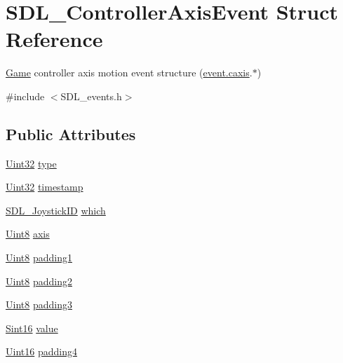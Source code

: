 \hypertarget{struct_s_d_l___controller_axis_event}{\section{S\-D\-L\-\_\-\-Controller\-Axis\-Event Struct Reference}
\label{struct_s_d_l___controller_axis_event}
}


\hyperlink{class_game}{Game} controller axis motion event structure (\hyperlink{union_s_d_l___event_aa8f6df0f2716fae56204b12ab4a4c289}{event.\-caxis}.$\ast$)  




{\ttfamily \#include $<$S\-D\-L\-\_\-events.\-h$>$}

\subsection*{Public Attributes}
\begin{DoxyCompactItemize}
\item 
\hyperlink{_s_d_l__stdinc_8h_add440eff171ea5f55cb00c4a9ab8672d}{Uint32} \hyperlink{struct_s_d_l___controller_axis_event_aa904b61e4763d28d887cf8afcc3cbb7c}{type}
\item 
\hyperlink{_s_d_l__stdinc_8h_add440eff171ea5f55cb00c4a9ab8672d}{Uint32} \hyperlink{struct_s_d_l___controller_axis_event_afc92dba0b4d1652a1ecf9e85606d1f14}{timestamp}
\item 
\hyperlink{_s_d_l__joystick_8h_a3c3d32500cb08f76ee8077983912c0bd}{S\-D\-L\-\_\-\-Joystick\-I\-D} \hyperlink{struct_s_d_l___controller_axis_event_a07087f68ea9d64b50047d65312ee7b94}{which}
\item 
\hyperlink{_s_d_l__stdinc_8h_a2944638813a090aa23e62f4da842c3e2}{Uint8} \hyperlink{struct_s_d_l___controller_axis_event_aba6543c143521aebce06a41a8cf79db0}{axis}
\item 
\hyperlink{_s_d_l__stdinc_8h_a2944638813a090aa23e62f4da842c3e2}{Uint8} \hyperlink{struct_s_d_l___controller_axis_event_af980495b1e24f9a868f2ccb25ce9629b}{padding1}
\item 
\hyperlink{_s_d_l__stdinc_8h_a2944638813a090aa23e62f4da842c3e2}{Uint8} \hyperlink{struct_s_d_l___controller_axis_event_a4a04fcd20a54db21c5258ab0e40c6ab5}{padding2}
\item 
\hyperlink{_s_d_l__stdinc_8h_a2944638813a090aa23e62f4da842c3e2}{Uint8} \hyperlink{struct_s_d_l___controller_axis_event_ab82598fe5621dca9b1a41f7b2ca1e9a0}{padding3}
\item 
\hyperlink{_s_d_l__stdinc_8h_a9d0257032c0e146ab6121bf0122712f5}{Sint16} \hyperlink{struct_s_d_l___controller_axis_event_a1ed7f14255ed01b982d40a38791d475a}{value}
\item 
\hyperlink{_s_d_l__stdinc_8h_a31fcc0a076c9068668173ee26d33e42b}{Uint16} \hyperlink{struct_s_d_l___controller_axis_event_ae0ad0f279b9978bbbac9f5b22ae8020b}{padding4}
\end{DoxyCompactItemize}


